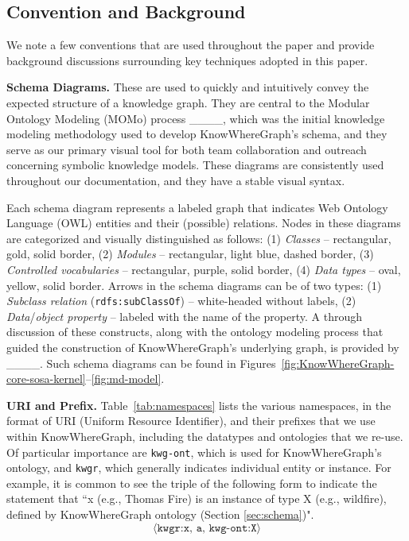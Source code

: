 
\subsection{Convention and Background}
\label{ssec:conv}
We note a few conventions that are used throughout the paper and provide background discussions surrounding key techniques adopted in this paper.

\textbf{Schema Diagrams.} These are used to quickly and intuitively convey the expected structure of a knowledge graph. They are central to the Modular Ontology Modeling (MOMo) process ____, which was the initial knowledge modeling methodology used to develop KnowWhereGraph's schema, and they serve as our primary visual tool for both team collaboration and outreach concerning symbolic knowledge models. These diagrams are consistently used throughout our documentation, and they have a stable visual syntax.

Each schema diagram represents a labeled graph that indicates Web Ontology Language (OWL) entities and their (possible) relations. Nodes in these diagrams are categorized and visually distinguished as follows: (1) \emph{Classes} -- rectangular, gold, solid border, (2) \emph{Modules} -- rectangular, light blue, dashed border, (3) \emph{Controlled vocabularies} -- rectangular, purple, solid border, (4) \emph{Data types} -- oval, yellow, solid border. Arrows in the schema diagrams can be of two types: (1) \emph{Subclass relation} (\texttt{rdfs:subClassOf}) -- white-headed without labels, (2) \emph{Data}/\emph{object property} -- labeled with the name of the property. A through discussion of these constructs, along with the ontology modeling process that guided the construction of KnowWhereGraph's underlying graph, is provided by ____. Such schema diagrams can be found in Figures~\ref{fig:KnowWhereGraph-core-sosa-kernel}--\ref{fig:md-model}.

\textbf{URI and Prefix.}
Table~\ref{tab:namespaces} lists the various namespaces, in the format of URI (Uniform Resource Identifier), and their prefixes that we use within KnowWhereGraph, including the datatypes and ontologies that we re-use. Of particular importance are \texttt{kwg-ont}, which is used for KnowWhereGraph's ontology, and \texttt{kwgr}, which generally indicates individual entity or instance. For example, it is common to see the triple of the following form to indicate the statement that ``x (e.g., Thomas Fire) is an instance of type X (e.g., wildfire), defined by KnowWhereGraph ontology (Section \ref{sec:schema})". 
\begin{equation*}
    \langle\texttt{kwgr:x, a, kwg-ont:X}\rangle
\end{equation*}

